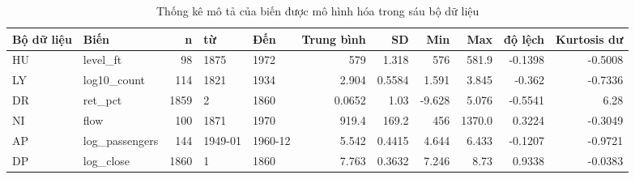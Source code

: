 \begin{table}[H]
\centering\scriptsize
\caption{Thống kê mô tả của biến được mô hình hóa trong sáu bộ dữ liệu}\label{tab:tab_eda_descriptive}
\begin{adjustbox}{max width=\linewidth}
\begin{tabular}{llrllrrrrrr}
\toprule
Bộ dữ liệu & Biến & n & từ & Đến & Trung bình & SD & Min & Max & độ lệch & Kurtosis dư \\
\midrule
HU & level\_ft & 98 & 1875 & 1972 & 579 & 1.318 & 576 & 581.9 & -0.1398 & -0.5008 \\
LY & log10\_count & 114 & 1821 & 1934 & 2.904 & 0.5584 & 1.591 & 3.845 & -0.362 & -0.7336 \\
DR & ret\_pct & 1859 & 2 & 1860 & 0.0652 & 1.03 & -9.628 & 5.076 & -0.5541 & 6.28 \\
NI & flow & 100 & 1871 & 1970 & 919.4 & 169.2 & 456 & 1370.0 & 0.3224 & -0.3049 \\
AP & log\_passengers & 144 & 1949-01 & 1960-12 & 5.542 & 0.4415 & 4.644 & 6.433 & -0.1207 & -0.9721 \\
DP & log\_close & 1860 & 1 & 1860 & 7.763 & 0.3632 & 7.246 & 8.73 & 0.9338 & -0.0383 \\
\bottomrule
\end{tabular}
\end{adjustbox}\par{}
\end{table}
